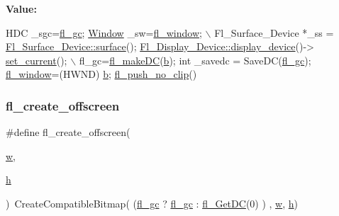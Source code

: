 {\bfseries Value\+:}
\begin{DoxyCode}
HDC \_sgc=\hyperlink{win32_8_h_a8b858ce5708f37c90ec7f8e57263eb20}{fl\_gc}; \hyperlink{mac_8_h_a213656d363e884b651cc92f58e863fc6}{Window} \_sw=\hyperlink{win32_8_h_afdab6664143864c36ba6b51782b32500}{fl\_window}; \(\backslash\)
   Fl\_Surface\_Device *\_ss = \hyperlink{class_fl___surface___device_a6a2643e352fdcb9e78faa167d1cd0a14}{Fl\_Surface\_Device::surface}(); 
      \hyperlink{class_fl___display___device_a888806f46c16a0c6cc7297fe553f535c}{Fl\_Display\_Device::display\_device}()->
      \hyperlink{class_fl___surface___device_a6f88aed1b68854433d60cf23731c3d79}{set\_current}(); \(\backslash\)
   fl\_gc=\hyperlink{win32_8_h_ae0ea9637a51cabdbf0ba5405c8d915c5}{fl\_makeDC}(\hyperlink{forms_8_h_a0ba06a290a384fa06b1b90745827dae2}{b}); \textcolor{keywordtype}{int} \_savedc = SaveDC(\hyperlink{win32_8_h_a8b858ce5708f37c90ec7f8e57263eb20}{fl\_gc}); \hyperlink{win32_8_h_afdab6664143864c36ba6b51782b32500}{fl\_window}=(HWND)
      \hyperlink{forms_8_h_a0ba06a290a384fa06b1b90745827dae2}{b}; \hyperlink{group__fl__drawings_ga0fce6c81d69c3a80c8073a338f1346fd}{fl\_push\_no\_clip}()
\end{DoxyCode}
\mbox{\label{win32_8_h_ac052986a562eabf83386c3f2a209954d}} 
\subsubsection{\texorpdfstring{fl\+\_\+create\+\_\+offscreen}{fl\_create\_offscreen}}
{\footnotesize\ttfamily \#define fl\+\_\+create\+\_\+offscreen(\begin{DoxyParamCaption}\item[{}]{\hyperlink{forms_8_h_aac374e320caaadeca4874add33b62af2}{w},  }\item[{}]{\hyperlink{forms_8_h_a7e427ba5b307f9068129699250690066}{h} }\end{DoxyParamCaption})~Create\+Compatible\+Bitmap( (\hyperlink{x_8_h_a6a655a6955c7b194471666e8055ca876}{fl\+\_\+gc} ? \hyperlink{x_8_h_a6a655a6955c7b194471666e8055ca876}{fl\+\_\+gc} \+: \hyperlink{win32_8_h_ab8c64c29fd758c51d58e815420d3fe61}{fl\+\_\+\+Get\+DC}(0) ) , \hyperlink{forms_8_h_aac374e320caaadeca4874add33b62af2}{w}, \hyperlink{forms_8_h_a7e427ba5b307f9068129699250690066}{h})}

\mbox{\label{win32_8_h_ad3ee137ce97f62457c9d8bb480a17ea4}} 
